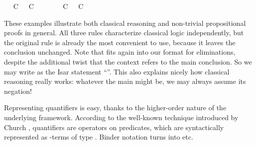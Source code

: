 \begin{isabellebody}
\ \isamarkupfalse%
\ {\isachardoublequoteopen}C\ {\isasymor}\ {\isasymnot}\ C{\isachardoublequoteclose}\ \isacommand{{\isachardot}{\isachardot}}\isamarkupfalse%
\isanewline
\ \ \ \ \isamarkupfalse%
\ {\isacharbackquoteopen}{\isasymnot}\ {\isacharparenleft}C\ {\isasymor}\ {\isasymnot}\ C{\isacharparenright}{\isacharbackquoteclose}\ \isamarkupfalse%
\ {\isasymbottom}\ \isacommand{{\isachardot}{\isachardot}}\isamarkupfalse%
\isanewline
\ \ \isamarkupfalse%
\isanewline
{}\isamarkupfalse%
%
\endisatagproof
{\isafoldproof}%
%
\isadelimproof
%
\endisadelimproof
%
\begin{isamarkuptext}%
\noindent These examples illustrate both classical reasoning and
  non-trivial propositional proofs in general.  All three rules
  characterize classical logic independently, but the original rule is
  already the most convenient to use, because it leaves the conclusion
  unchanged.  Note that  fits again into our
  format for eliminations, despite the additional twist that the
  context refers to the main conclusion.  So we may write  as the Isar statement ``''.
  This also explains nicely how classical reasoning really works:
  whatever the main  might be, we may always assume its
  negation!%
\end{isamarkuptext}%
\isamarkuptrue%
\isamarkupfalse%
%
\isamarkuptrue%
%
\begin{isamarkuptext}%
Representing quantifiers is easy, thanks to the higher-order nature
  of the underlying framework.  According to the well-known technique
  introduced by Church \cite{church40}, quantifiers are operators on
  predicates, which are syntactically represented as \isa{{\isachardoublequote}{\isasymlambda}{\isachardoublequote}}-terms
  of type .  Binder notation turns  into  etc.%
\end{isamarkuptext}%
\isamarkuptrue%
\isamarkupfalse%

\end{isabellebody}
